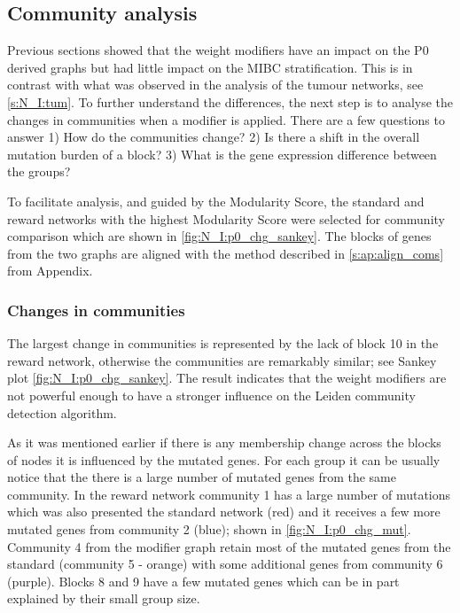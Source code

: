 \subsection{Community analysis} \label{s:N_I:com_analysis}

Previous sections showed that the weight modifiers have an impact on the P0 derived graphs but had little impact on the MIBC stratification. This is in contrast with what was observed in the analysis of the tumour networks, see \cref{s:N_I:tum}. To further understand the differences, the next step is to analyse the changes in communities when a modifier is applied. There are a few questions to answer 1) How do the communities change? 2) Is there a shift in the overall mutation burden of a block? 3) What is the gene expression difference between the groups? 

To facilitate analysis, and guided by the Modularity Score, the standard and reward networks with the highest Modularity Score were selected for community comparison which are shown in \cref{fig:N_I:p0_chg_sankey}. The blocks of genes from the two graphs are aligned with the method described in \cref{s:ap:align_coms} from Appendix.

\subsubsection*{Changes in communities}

The largest change in communities is represented by the lack of block 10 in the reward network, otherwise the communities are remarkably similar; see  Sankey plot \cref{fig:N_I:p0_chg_sankey}. The result indicates that the weight modifiers are not powerful enough to have a stronger influence on the Leiden community detection algorithm. 

As it was mentioned earlier if there is any membership change across the blocks of nodes it is influenced by the mutated genes. For each group it can be usually notice that the there is a large number of mutated genes from the same community. In the reward network community 1 has a large number of mutations which was also presented the standard network (red) and it receives a few more mutated genes from community 2 (blue); shown in \cref{fig:N_I:p0_chg_mut}. Community 4 from the modifier graph retain most of the mutated genes from the standard (community 5 - orange) with some additional genes from community 6 (purple). Blocks 8 and 9 have a few mutated genes which can be in part explained by their small group size. 


